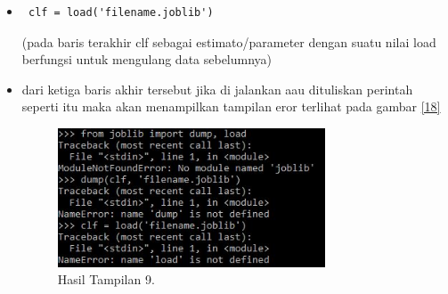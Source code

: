 \begin{itemize}
\item\begin{verbatim} clf = load('filename.joblib')\end{verbatim}(pada baris terakhir clf sebagai estimato/parameter dengan suatu nilai load berfungsi untuk mengulang data sebelumnya)
\item dari ketiga baris akhir tersebut jika di jalankan aau dituliskan perintah seperti itu maka akan menampilkan tampilan eror terlihat pada gambar \ref{18}
\begin{figure}[!htbp]\centerline{\includegraphics[width=0.75\textwidth]{figures/huda/18.JPG}}\caption{Hasil Tampilan 9.}\label{19}\end{figure}
\end{itemize}
